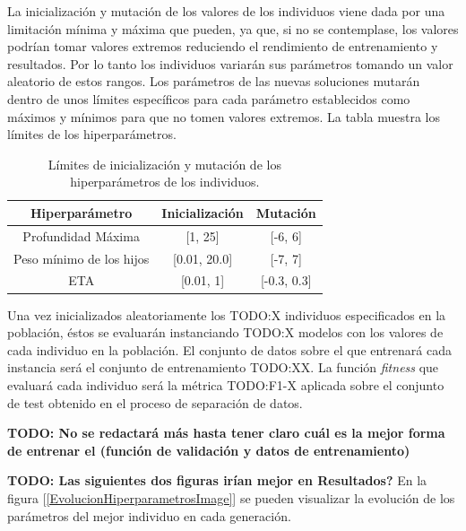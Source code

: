         La inicialización y mutación de los valores de los individuos viene dada por una limitación mínima y máxima que pueden, ya que, si no se contemplase, los valores podrían tomar valores extremos reduciendo el rendimiento de entrenamiento y resultados. Por lo tanto los individuos variarán sus parámetros tomando un valor aleatorio de estos rangos.  Los parámetros de las nuevas soluciones mutarán dentro de unos límites específicos para cada parámetro establecidos como máximos y mínimos para que no tomen valores extremos. La tabla \cite{InitAndMutationLimitsHyperparamsTable} muestra los límites de los hiperparámetros.

        \begin{table}[H]
            \centering
                \begin{tabular}{ |c|c|c| } 
                \hline
                \textbf{Hiperparámetro} & \textbf{Inicialización} & \textbf{Mutación}\\
                \hline
                    Profundidad Máxima & [1, 25] & [-6, 6]\\ 
                    Peso mínimo de los hijos & [0.01, 20.0] & [-7, 7] \\ 
                    ETA & [0.01, 1] &  [-0.3, 0.3] \\ 
                \hline

                \end{tabular}

            \caption{Límites de inicialización y mutación de los hiperparámetros de los individuos.}
            \label{InitAndMutationLimitsHyperparamsTable}
        \end{table}

        Una vez inicializados aleatoriamente los TODO:X individuos especificados en la población, éstos se evaluarán instanciando TODO:X modelos con los valores de cada individuo en la población. El conjunto de datos sobre el que entrenará cada instancia  será el conjunto de entrenamiento TODO:XX. La función \textit{fitness} que evaluará cada individuo será la métrica TODO:F1-X aplicada sobre el conjunto de test obtenido en el proceso de separación de datos.

        \textbf{TODO: No se redactará más hasta tener claro cuál es la mejor forma de entrenar el  (función de validación y datos de entrenamiento)}


        \textbf{TODO: Las siguientes dos figuras irían mejor en Resultados?}
        En la figura [\ref{EvolucionHiperparametrosImage}] se pueden visualizar la evolución de los parámetros del mejor individuo en cada generación.

